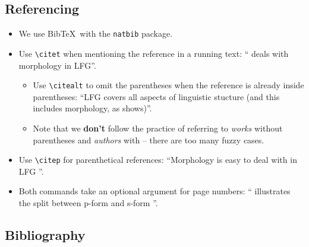 \documentclass[linguex]{lfg-proc}
\begin{document}
\subsection{Referencing}

\begin{itemize}
  \item We use Bib\TeX\ with the \verb=natbib= package.
  \item Use \verb=\citet= when mentioning the reference in a running text:
        ``\citet{Dalrymple2015} deals with morphology in LFG''.
        \begin{itemize}
          \item Use \verb=\citealt= to omit the parentheses when the reference
                is already inside parentheses: ``LFG covers all aspects of
                linguistic stucture (and this includes morphology, as
                \citealt{Dalrymple2015} shows)''.
          \item Note that we \textbf{don't} follow the practice of referring to
                \emph{works} without parentheses and \emph{authors} with --
                there are too many fuzzy cases.
        \end{itemize}
  \item Use \verb=\citep= for parenthetical references: ``Morphology is easy to
        deal with in LFG \citep{Dalrymple2015}''.
  \item Both commands take an optional argument for page numbers:
        ``\citet[66]{Dalrymple2015} illustrates the split between p-form and
        s-form \citep[177]{dalrymple-mycock:prosody}''.
\end{itemize}

\subsection{Bibliography}
\end{document}
